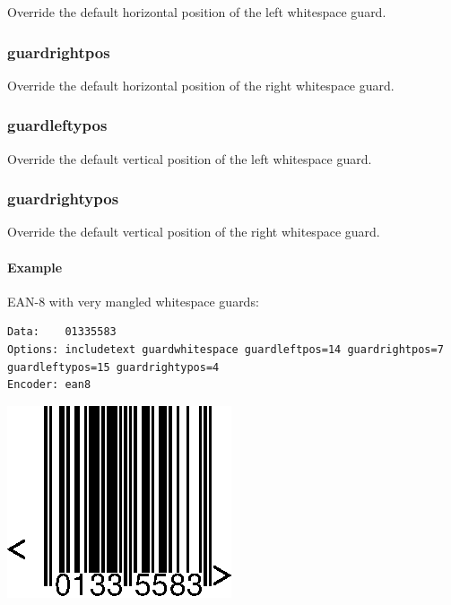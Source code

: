 Override the default horizontal position of the left whitespace guard.

\hypertarget{guardrightpos}{%
\subsubsection{guardrightpos}\label{guardrightpos}}

Override the default horizontal position of the right whitespace guard.

\hypertarget{guardleftypos}{%
\subsubsection{guardleftypos}\label{guardleftypos}}

Override the default vertical position of the left whitespace guard.

\hypertarget{guardrightypos}{%
\subsubsection{guardrightypos}\label{guardrightypos}}

Override the default vertical position of the right whitespace guard.

\hypertarget{example-38}{%
\paragraph{Example}\label{example-38}}

EAN-8 with very mangled whitespace guards:

\begin{verbatim}
Data:    01335583
Options: includetext guardwhitespace guardleftpos=14 guardrightpos=7 guardleftypos=15 guardrightypos=4
Encoder: ean8
\end{verbatim}

\includegraphics{images/optguardpos.eps}
